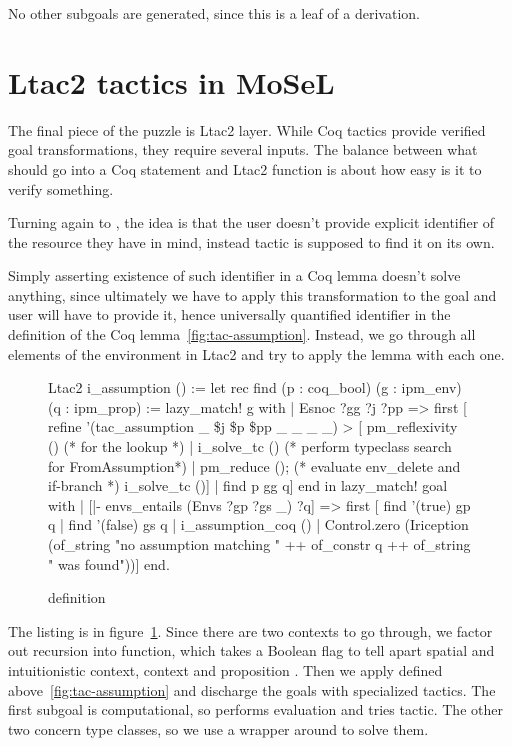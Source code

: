 No other subgoals are generated, since this is a leaf of a derivation.

\section{Ltac2 tactics in MoSeL}
\label{sec:ltac2-tactics-mosel}

The final piece of the puzzle is Ltac2 layer.
While Coq tactics provide verified goal transformations, they require several inputs.
The balance between what should go into a Coq statement and Ltac2 function is about how easy is it to verify something.

Turning again to , the idea is that the user doesn't provide explicit identifier of the resource they have in mind, instead tactic is supposed to find it on its own.

Simply asserting existence of such identifier in a Coq lemma doesn't solve anything, since ultimately we have to apply this transformation to the goal and user will have to provide it, hence universally quantified identifier in the definition of the Coq lemma~\ref{fig:tac-assumption}.
Instead, we go through all elements of the environment in Ltac2 and try to apply the lemma with each one.

\begin{figure}
\begin{coq}
Ltac2 i_assumption () :=
  let rec find (p : coq_bool) (g : ipm_env) (q : ipm_prop) :=
      lazy_match! g with
      | Esnoc ?gg ?j ?pp =>
        first [ refine '(tac_assumption _ \$j \$p \$pp _ _ _ _) >
                [ pm_reflexivity () (* for the lookup *)
                | i_solve_tc () (* perform typeclass search for FromAssumption*)
                | pm_reduce (); (* evaluate env_delete and if-branch *)
                  i_solve_tc ()]
              | find p gg q]
      end
  in
  lazy_match! goal with
  | [|- envs_entails (Envs ?gp ?gs _) ?q] =>
     first [ find '(true) gp q
           | find '(false) gs q
           | i_assumption_coq ()
           | Control.zero (Iriception (of_string "no assumption matching " ++
                                       of_constr q ++
                                       of_string " was found"))]
  end.
\end{coq}
\caption{ definition}
\label{fig:i-assumption-def}
\end{figure}

The listing is in figure~\ref{fig:i-assumption-def}.
Since there are two contexts to go through, we factor out recursion into  function, which takes a Boolean flag  to tell apart spatial and intuitionistic context, context  and proposition .
Then we apply  defined above~\ref{fig:tac-assumption} and discharge the goals with specialized tactics.
The first subgoal  is computational, so  performs evaluation and tries  tactic.
The other two concern type classes, so we use a wrapper around  to solve them.

